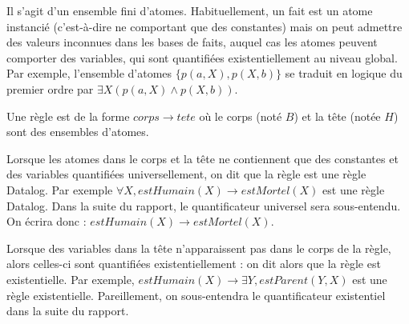 \begin{definition} Il s'agit d'un ensemble fini d'atomes. Habituellement, un fait est un atome instancié (c'est-à-dire ne comportant que des constantes) mais on peut admettre des valeurs inconnues dans les bases de faits, auquel cas les atomes peuvent comporter des variables, qui sont quantifiées existentiellement au niveau global. Par exemple, l'ensemble d'atomes $\{p(a,X), p(X,b)\}$ se traduit en logique du premier ordre par $\exists X (p(a,X) \land p(X,b))$.
\end{definition}

\begin{definition}[Règle]
Une règle est de la forme $corps \rightarrow tete$ où le corps (noté $B$) et la tête (notée $H$) sont des ensembles d'atomes.
\par Lorsque les atomes dans le corps et la tête ne contiennent que des constantes et des variables quantifiées universellement, on dit que la règle est une règle Datalog. Par exemple $\forall X, estHumain(X) \rightarrow estMortel(X)$ est une règle Datalog. Dans la suite du rapport, le quantificateur universel sera sous-entendu. On écrira donc : $estHumain(X) \rightarrow estMortel(X)$.
\par Lorsque des variables dans la tête n'apparaissent pas dans le corps de la règle, alors celles-ci sont quantifiées existentiellement : on dit alors que la règle est existentielle. Par exemple, $estHumain(X) \rightarrow \exists Y, estParent(Y,X)$ est une règle existentielle. Pareillement, on sous-entendra le quantificateur existentiel dans la suite du rapport.
\end{definition}



